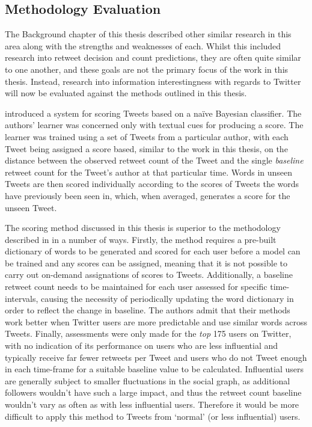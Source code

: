 \subsection{Methodology Evaluation}
The Background chapter of this thesis described other similar research in this area along with the strengths and weaknesses of each. Whilst this included research into retweet decision and count predictions, they are often quite similar to one another, and these goals are not the primary focus of the work in this thesis. Instead, research into information interestingness with regards to Twitter will now be evaluated against the methods outlined in this thesis.

\cite{gransee12} introduced a system for scoring Tweets based on a na{\"i}ve Bayesian classifier. The authors' learner was concerned only with textual cues for producing a score. The learner was trained using a set of Tweets from a particular author, with each Tweet being assigned a score based, similar to the work in this thesis, on the distance between the observed retweet count of the Tweet and the single \textit{baseline} retweet count for the Tweet's author at that particular time. Words in unseen Tweets are then scored individually according to the scores of Tweets the words have previously been seen in, which, when averaged, generates a score for the unseen Tweet.

The scoring method discussed in this thesis is superior to the methodology described in \cite{gransee12} in a number of ways. Firstly, the method requires a pre-built dictionary of words to be generated and scored for each user before a model can be trained and any scores can be assigned, meaning that it is not possible to carry out on-demand assignations of scores to Tweets. Additionally, a baseline retweet count needs to be maintained for each user assessed for specific time-intervals, causing the necessity of periodically updating the word dictionary in order to reflect the change in baseline. The authors admit that their methods work better when Twitter users are more predictable and use similar words across Tweets. Finally, assessments were only made for the \textit{top} 175 users on Twitter, with no indication of its performance on users who are less influential and typically receive far fewer retweets per Tweet and users who do not Tweet enough in each time-frame for a suitable baseline value to be calculated. Influential users are generally subject to smaller fluctuations in the social graph, as additional followers wouldn't have such a large impact, and thus the retweet count baseline wouldn't vary as often as with less influential users. Therefore it would be more difficult to apply this method to Tweets from `normal' (or less influential) users.

